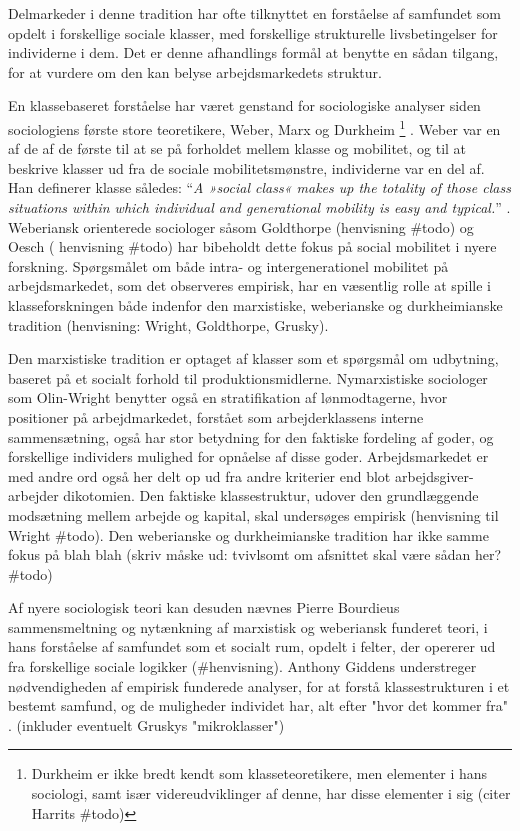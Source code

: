 Delmarkeder i denne tradition har ofte tilknyttet en forståelse af samfundet som opdelt i forskellige sociale klasser, med forskellige strukturelle livsbetingelser for individerne i dem. Det er denne afhandlings formål at benytte en sådan tilgang, for at vurdere om den kan belyse arbejdsmarkedets struktur.

En klassebaseret forståelse har været genstand for sociologiske analyser siden sociologiens første store teoretikere, Weber, Marx og Durkheim%
%
\footnote{Durkheim er ikke bredt kendt som klasseteoretikere, men elementer i hans sociologi, samt især videreudviklinger af denne, har disse elementer i sig (citer Harrits \#todo)}%
%
. Weber var en af de af de første til at se på forholdet mellem klasse og mobilitet, og til at beskrive klasser ud fra de sociale mobilitetsmønstre, individerne var en del af. Han definerer klasse således: “\emph{A »social class« makes up the totality of those class situations within which individual and generational mobility is easy and typical.}” \parencite[302]{Weber1978}. Weberiansk orienterede sociologer såsom Goldthorpe (henvisning \#todo) og Oesch ( henvisning \#todo) har bibeholdt dette fokus på social mobilitet i nyere forskning. Spørgsmålet om både intra- og intergenerationel mobilitet på arbejdsmarkedet, som det observeres empirisk, har en væsentlig rolle at spille i klasseforskningen både indenfor den marxistiske, weberianske og durkheimianske tradition (henvisning: Wright, Goldthorpe, Grusky).

Den marxistiske tradition er optaget af klasser som et spørgsmål om udbytning, baseret på et socialt forhold til produktionsmidlerne. Nymarxistiske sociologer som Olin-Wright benytter også en stratifikation af lønmodtagerne, hvor positioner på arbejdmarkedet, forstået som arbejderklassens interne sammensætning, også har stor betydning for den faktiske fordeling af goder, og forskellige individers mulighed for opnåelse af disse goder. Arbejdsmarkedet er med andre ord også her delt op ud fra andre kriterier end blot arbejdsgiver-arbejder dikotomien. Den faktiske klassestruktur, udover den grundlæggende modsætning mellem arbejde og kapital, skal undersøges empirisk (henvisning til Wright \#todo). Den weberianske og durkheimianske tradition har ikke samme fokus på blah blah (skriv måske ud: tvivlsomt om afsnittet skal være sådan her? \#todo)

Af nyere sociologisk teori kan desuden nævnes Pierre Bourdieus sammensmeltning og nytænkning af marxistisk og weberiansk funderet teori, i hans forståelse af samfundet som et socialt rum, opdelt i felter, der opererer ud fra forskellige sociale logikker (\#henvisning). Anthony Giddens understreger nødvendigheden af empirisk funderede analyser, for at forstå klassestrukturen i et bestemt samfund, og de muligheder individet har, alt efter "hvor det kommer fra" \parencite[48,110]{Giddens1973}. (inkluder eventuelt Gruskys "mikroklasser")

